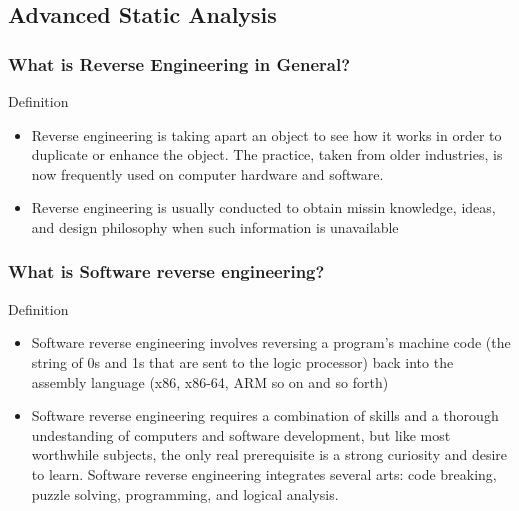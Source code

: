 \documentclass[]{beamer}
\begin{document}
	\subsection{Advanced Static Analysis}
		\begin{frame}
			\frametitle{What is Reverse Engineering in General?}
			
			\begin{block}{Definition}
				\begin{itemize}
					\item{Reverse engineering is taking apart an object to see how it works in order to duplicate or enhance the object. The practice, taken from older industries, is now frequently used on computer hardware and software.}
					\item{Reverse engineering is usually conducted to obtain missin knowledge, ideas, and design philosophy when such information is unavailable}
				\end{itemize}
			\end{block}
		\end{frame}	
		\begin{frame}	
			\frametitle{What is Software reverse engineering?}
			\begin{block}{Definition}
				\begin{itemize}
					\item{Software reverse engineering involves reversing a program's machine code (the string of 0s and 1s that are sent to the logic processor) back into the assembly language (x86, x86-64, ARM so on and so forth) }
					\item{Software reverse engineering requires a combination of skills and a thorough undestanding of computers and software development, but like most worthwhile subjects, the only real prerequisite is a strong curiosity and desire to learn. Software reverse engineering integrates several arts: code breaking, puzzle solving, programming, and logical analysis.}
				\end{itemize}
			\end{block}
		\end{frame}
\end{document}
